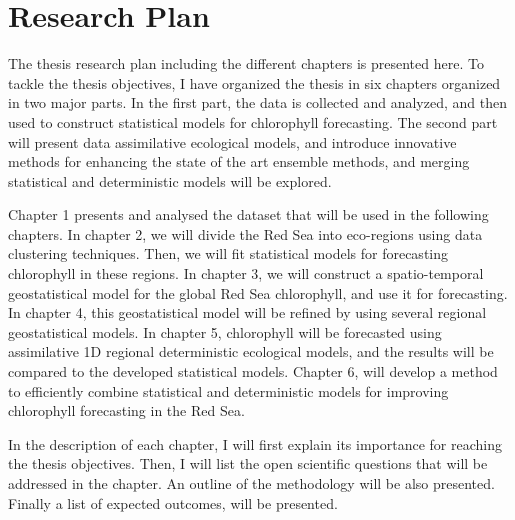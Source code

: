 \chapter{Research Plan}

The thesis research plan including the different chapters is presented here. To
tackle the thesis objectives, I have organized the thesis in six chapters
organized in two major parts. In the first part, the data is collected and
analyzed, and then used to construct statistical models for chlorophyll
forecasting. The second part will present data assimilative ecological models,
and introduce innovative methods for enhancing the state of the art ensemble
methods, and merging statistical and deterministic models will be explored.

Chapter 1 presents and analysed the dataset that will be used in the following
chapters.  In chapter 2, we will divide the Red Sea into eco-regions using data
clustering techniques. Then, we will fit statistical models for forecasting
chlorophyll in these regions. In chapter 3, we will construct a spatio-temporal
geostatistical model for the global Red Sea chlorophyll, and use it for
forecasting. In chapter 4, this geostatistical model will be refined by using
several regional geostatistical models. In chapter 5, chlorophyll will be
forecasted using assimilative 1D regional deterministic ecological models, and
the results will be compared to the developed statistical models.  Chapter 6,
will develop a method to efficiently combine statistical and deterministic
models for improving chlorophyll forecasting in the Red Sea.

In the description of each chapter, I will first explain its importance for
reaching the thesis objectives. Then, I will list the open scientific questions
that will be addressed in the chapter. An outline of the methodology will be
also presented. Finally a list of expected outcomes, will be presented.
